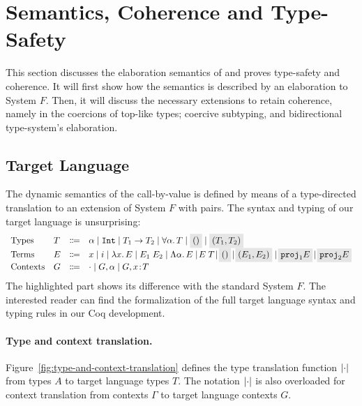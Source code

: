 \section{Semantics, Coherence and Type-Safety}\label{sec:disjoint}
This section discusses the elaboration semantics of \name and proves
type-safety and coherence.
It will first show how the semantics is described by an elaboration to System $F$.
Then, it will discuss the necessary extensions to retain coherence, namely in the coercions of 
top-like types; coercive subtyping, and bidirectional type-system's
elaboration. 

\subsection{Target Language}
The dynamic semantics of the call-by-value \name is defined by means of
a type-directed translation to an extension of System $F$ with
pairs.
The syntax and typing of our target language is unsurprising: 
  \[
    \begin{array}{llrl}
      \text{Types}    & T & \Coloneqq & \alpha \mid \tyint \mid {T_1}
      \to {T_2} \mid \for \alpha T \mid \highlight {$()$} \mid
      \highlight {$\pair {T_1} {T_2}$} \\
      \text{Terms}    & E & \Coloneqq & x \mid i \mid \lamty x T E \mid \app {E_1} {E_2} \mid 
                                        \blam \alpha E \mid \! \tapp E T \!
                                        \mid \! \highlight {$()$} \! \mid \! \highlight {$ \pair {E_1} {E_2} $} 
                                        \mid \! \highlight {$ \proj 1 E
                                          $} \! \mid \! \highlight {$ \proj 2 E
                                          $} \\
      \text{Contexts} & G & \Coloneqq & \cdot \mid G, \alpha \mid G, x \oftype T \\
    \end{array}
  \]
The highlighted part shows its difference with the standard System $F$. 
The interested reader can find the formalization of the full target language
syntax and typing rules in our Coq development.

\paragraph{Type and context translation.}
Figure~\ref{fig:type-and-context-translation} defines the type translation
function $\lvert \cdot \rvert$ from \name types $A$ to target language types $T$. 
The notation $\lvert \cdot \rvert$ is also overloaded for context translation from \name
contexts $\Gamma$ to target language contexts $G$.

